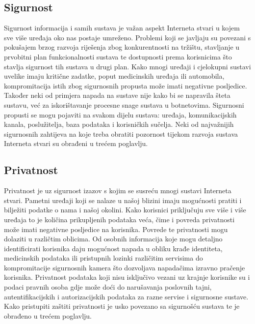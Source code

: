 \documentclass[times, utf8, diplomski]{fer}
\begin{document}
\subsection{Sigurnost}
Sigurnost informacija i samih sustava je važan aspekt Interneta stvari u kojem sve više uređaja oko nas postaje umreženo. Problemi koji se javljaju su povezani s pokušajem brzog razvoja riješenja zbog konkurentnosti na tržištu, stavljanje u prvobitni plan funkcionalnosti sustava te dostupnosti prema korisnicima što stavlja sigurnost tih sustava u drugi plan. Kako mnogi uređaji i cjelokupni sustavi uvelike imaju kritične zadatke, poput medicinskih uređaja ili automobila, kompromitacija istih zbog sigurnosnih propusta može imati negativne posljedice. Također neki od primjera napada na sustave nije kako bi se napravila šteta sustavu, već za iskorištavanje procesne snage sustava u botnetovima. Sigurnosni propusti se mogu pojaviti na svakom dijelu sustava: uređaja, komunikacijskih kanala, poslužitelja, baza podataka i korisničkih sučelja. Neki od najvažnijih sigurnosnih zahtijeva na koje treba obratiti pozornost tijekom razvoja sustava Interneta stvari su obrađeni u trećem poglavlju.

\subsection{Privatnost}
Privatnost je uz sigurnost izazov s kojim se susreću mnogi sustavi Interneta stvari. Pametni uređaji koji se nalaze u našoj blizini imaju mogućnosti pratiti i bilježiti podatke o nama i našoj okolini. Kako korisnici priključuju sve više i više uređaja to je količina prikupljenih podataka veća, čime i povreda privatnosti može imati negativne posljedice na korisnika. Povrede te privatnosti mogu dolaziti u različtim oblicima. Od osobnih informacija koje mogu detaljno identificirati korisnika daju mogućnost napada u obliku krađe identiteta, medicinskih podataka ili pristupnih lozinki različitim servisima do kompromitacije sigurnosnih kamera što dozvoljava napadačima izravno pračenje korisnika. Privatnost podataka koji nisu isključivo vezani uz krajnje korisnike su i podaci pravnih osoba gdje može doći do narušavanja poslovnih tajni, autentifikacijskih i autorizacijskih podataka za razne servise i sigurnosne sustave. Kako pristupiti zaštiti privatnosti je usko povezano sa sigurnošću sustava te je obrađeno u trećem poglavlju.
\end{document}
